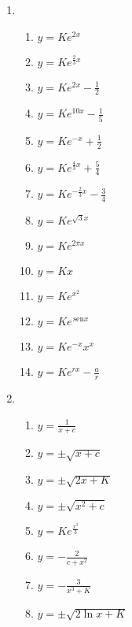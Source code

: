 \documentclass[a4paper]{article}
\providecommand{\sin}{} \renewcommand{\sin}{\hspace{2pt}\mathrm{sen}}
\begin{document}
\begin{enumerate}
\item
  \begin{enumerate}
  \item $y = Ke^{2x}$
  \item $y = Ke^{\frac{2}{3}x}$
  \item $y = Ke^{2x} - \frac{1}{2}$
  \item $y = Ke^{10x} - \frac{1}{5}$
  \item $y = Ke^{-x} + \frac{1}{2}$
  \item $y = Ke^{\frac{4}{3}x} + \frac{5}{4}$
  \item $y = Ke^{-\frac{2}{3}x} - \frac{3}{4}$
  \item $y = Ke^{\sqrt{3}x}$
  \item $y = Ke^{2\pi x}$
  \item $y = Kx$
  \item $y = Ke^{x^2}$
  \item $y = Ke^{\sin x}$
  \item $y = Ke^{-x}x^x$
  \item $y = Ke^{rx} - \frac{a}{r}$
  \end{enumerate}

\item
  \begin{enumerate}
  \item $y = \frac{1}{x+c}$
  \item $y = \pm \sqrt{x + c}$
  \item $y = \pm \sqrt{2x+K}$
  \item $y = \pm \sqrt{x^2 + c}$
  \item $y = Ke^{\frac{x^3}{3}}$
  \item $y = -\frac{2}{c+x^2}$
  \item $y = -\frac{3}{x^3+K}$
  \item $y = \pm \sqrt{2\ln x +K}$
  \end{enumerate}
\end{enumerate}
\end{document}
